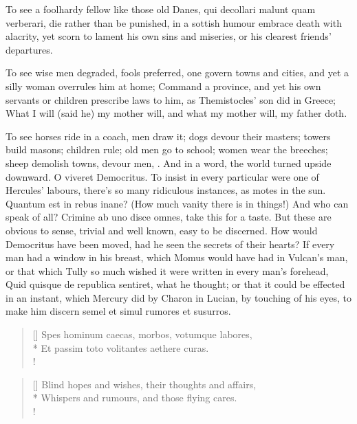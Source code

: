 {To see a foolhardy fellow like those old Danes, qui decollari malunt
quam verberari, die rather than be punished, in a sottish humour
embrace death with alacrity, yet scorn to lament his own sins and
miseries, or his clearest friends' departures.

To see wise men degraded, fools preferred, one govern towns and cities,
and yet a silly woman overrules him at home; Command a province,
and yet his own servants or children prescribe laws to him, as
Themistocles' son did in Greece; What I will (said he) my mother
will, and what my mother will, my father doth.

To see horses ride in a coach, men draw it; dogs devour their masters; towers build masons;
children rule; old men go to school; women wear the breeches;
sheep demolish towns, devour men, \etc{}. And in a word, the world
turned upside downward. O viveret Democritus.
To insist in every particular were one of Hercules' labours,
there's so many ridiculous instances, as motes in the sun. Quantum est
in rebus inane? (How much vanity there is in things!) And who can speak
of all? Crimine ab uno disce omnes, take this for a taste.
But these are obvious to sense, trivial and well known, easy to be
discerned. How would Democritus have been moved, had he seen the
secrets of their hearts? If every man had a window in his breast, which
Momus would have had in Vulcan's man, or that which Tully so much
wished it were written in every man's forehead, Quid quisque de
republica sentiret, what he thought; or that it could be effected in an
instant, which Mercury did by Charon in Lucian, by touching of his
eyes, to make him discern semel et simul rumores et susurros.

\settowidth{\versewidth}{Spes hominum caecas, morbos, votumque labores,}
\begin{verse}[\versewidth]
Spes hominum caecas, morbos, votumque labores,\\*
Et passim toto volitantes aethere curas.\\!
\end{verse}

\settowidth{\versewidth}{Blind hopes and wishes, their thoughts and affairs,}
\begin{verse}[\versewidth]
Blind hopes and wishes, their thoughts and affairs,\\*
Whispers and rumours, and those flying cares.\\!
\end{verse}

}
